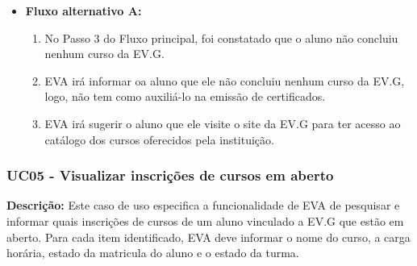 \begin{itemize}
\begin{enumerate}
        \end{enumerate}
    \item \textbf{Fluxo alternativo A:}
        \begin{enumerate}
            \item No Passo 3 do Fluxo principal, foi constatado que o aluno não concluiu nenhum curso da EV.G.
            \item EVA irá informar oa aluno que ele não concluiu nenhum curso da EV.G, logo, não tem como auxiliá-lo na emissão de certificados.
            \item EVA irá sugerir o aluno que ele visite o site da EV.G para ter acesso ao catálogo dos cursos oferecidos pela instituição.
        \end{enumerate}
\end{itemize}


\subsubsection{UC05 - Visualizar inscrições de cursos em aberto}
\textbf{Descrição:} Este caso de uso especifica a funcionalidade de EVA de pesquisar e informar quais inscrições de cursos de um aluno vinculado a EV.G que estão em aberto. Para cada item identificado, EVA deve informar o nome do curso, a carga horária, estado da matricula do aluno e o estado da turma. 

